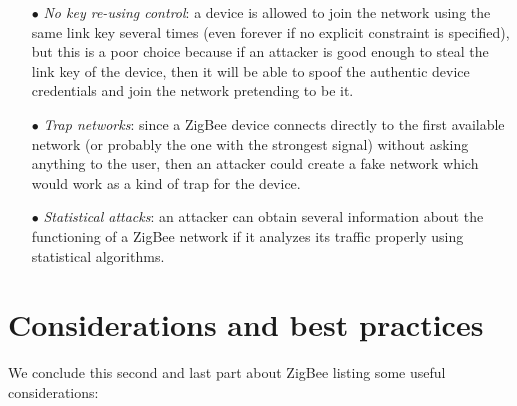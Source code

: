 \documentclass[12pt]{report}
\begin{document}
{\begin{itemize}
\begin{itemize}
\item \emph{Flooding}: it consists in the simple sending of tons of messages towards victim devices. For instance, an attacker could replay all the messages it is able to craft (or create legit messages, if it already knows the network key).\\
This kind of attack where the replay messages are sent to all the network devices is called \emph{broadcast storm attack}.\\

\item \emph{Physical Jamming}: this is a physical attack which involves tools able to cause signal interferences big enough to prevent communication among devices.\\

\item \emph{Sinkhole attack}: this attack consists in sending messages in the network in order to compromise communication, altering the routing tables and redirecting the traffic to a fake device through fake routing paths, which cannot be able to carry on the transmission.
\end{itemize}

\item[$\bullet$] \emph{No key re-using control}: a device is allowed to join the network using the same link key several times (even forever if no explicit constraint is specified), but this is a poor choice because if an attacker is good enough to steal the link key of the device, then it will be able to spoof the authentic device credentials and join the network pretending to be it.

\item[$\bullet$] \emph{Trap networks}: since a ZigBee device connects directly to the first available network (or probably the one with the strongest signal) without asking anything to the user, then an attacker could create a fake network which would work as a kind of trap for the device.

\item[$\bullet$] \emph{Statistical attacks}: an attacker can obtain several information about the functioning of a ZigBee network if it analyzes its traffic properly using statistical algorithms.\\ 
\end{itemize}

\clearpage
\section{Considerations and best practices}
\bigskip
We conclude this second and last part about ZigBee listing some useful considerations:

}
\end{document}
